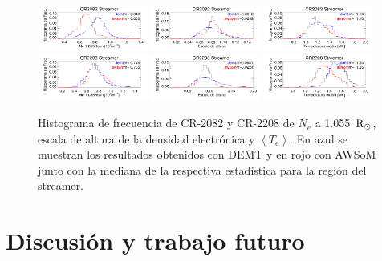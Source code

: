\documentclass[baaa]{baaa}
\begin{document}
\begin{figure}[h!]
  \centering
  \includegraphics[width=0.32\textwidth]{proceeding_2082_demt_awsom_streamer_ne_1055.pdf}
  \includegraphics[width=0.32\textwidth]{proceeding_2082_demt_awsom_streamer_lambda_n.pdf}  
  \includegraphics[width=0.32\textwidth]{proceeding_2082_demt_awsom_streamer_Tm.pdf}\\
  \includegraphics[width=0.32\textwidth]{proceeding_2208_demt_awsom_streamer_ne_1055.pdf}
  \includegraphics[width=0.32\textwidth]{proceeding_2208_demt_awsom_streamer_lambda_n.pdf}
  \includegraphics[width=0.32\textwidth]{proceeding_2208_demt_awsom_streamer_Tm.pdf}
  \caption{Histograma de frecuencia de CR-2082 y CR-2208 de $N_e$ a 1.055~${\rm R_\odot}$, escala de altura de la 
  densidad electrónica y $\left<T_e\right>$. En azul se muestran los resultados obtenidos con DEMT y en rojo con AWSoM 
  junto con la mediana de la respectiva estadística para la región del streamer.}
  \label{fig-histos}
\end{figure}


\section{Discusión y trabajo futuro}
\end{document}
